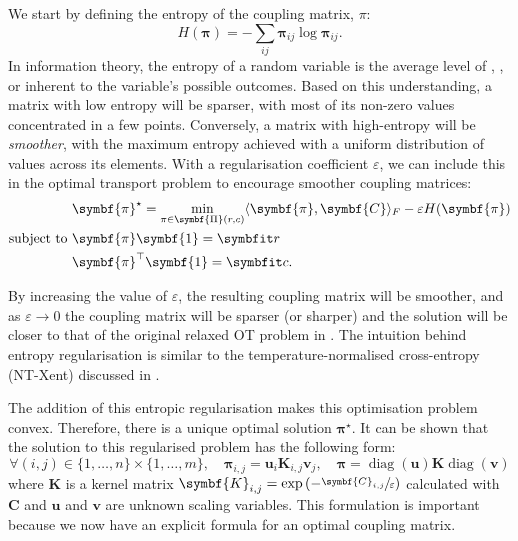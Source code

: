 We start by defining the entropy of the coupling matrix, $\pi$:
\begin{equation}
    H(\symbf{\pi}) = -\sum_{ij}\symbf{\pi}_{ij}\log\symbf{\pi}_{ij}.
\end{equation}
In information theory, the entropy of a random variable is the average level of , , or  inherent to the variable's possible outcomes. Based on this understanding, a matrix with low entropy will be sparser, with most of its non-zero values concentrated in a few points. Conversely, a matrix with high-entropy will be \textit{smoother}, with the maximum entropy achieved with a uniform distribution of values across its elements. With a regularisation coefficient $\varepsilon$, we can include this in the optimal transport problem to encourage smoother coupling matrices:
\begin{align}
& \symbf{\pi}^\star = \min_{\pi \in \symbf{\Pi}(r, c)}\langle\symbf{\pi},\symbf{C}\rangle_{F} -\varepsilon H(\symbf{\pi})\\
\text{subject to } &\symbf{\pi}\symbf{1} = \bfitr \nonumber\\
&\symbf{\pi}^{\top}\symbf{1} = \bfitc. \nonumber
\end{align}

By increasing the value of $\varepsilon$, the resulting coupling matrix will be smoother, and as $\varepsilon \rightarrow 0$ the coupling matrix will be sparser (or sharper) and the solution will be closer to that of the original relaxed OT problem in . The intuition behind entropy regularisation is similar to the temperature-normalised cross-entropy (NT-Xent) discussed in .

The addition of this entropic regularisation makes this optimisation problem convex. Therefore, there is a unique optimal solution $\symbf{\pi}^\star$. It can be shown that the solution to this regularised problem has the following form:
\begin{equation}
    \forall (i,j) \in \{1,…,n\}\times \{1, …, m\},\quad \symbf{\pi}_{i,j} = \symbf{u}_i \symbf{K}_{i,j} \symbf{v}_j, \quad \symbf{\pi} = \operatorname{diag}(\symbf{u}) \symbf{K} \operatorname{diag}(\symbf{v})
    \label{eqn:ot-mat-scaling}
\end{equation}
where $\symbf{K}$ is a kernel matrix $\symbf{K}_{i,j}=\exp{(-\sfrac{\symbf{C}_{i,j}}{\varepsilon})}$ calculated with $\symbf{C}$ and $\symbf{u}$ and $\symbf{v}$ are unknown scaling variables. This formulation is important because we now have an explicit formula for an optimal coupling matrix.

